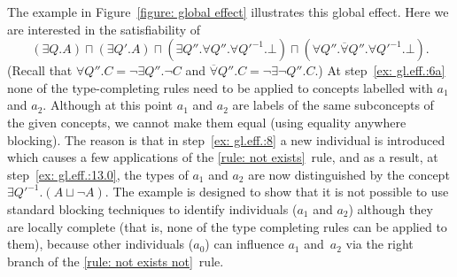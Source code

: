 \documentclass[leqno
,pdflatex
,prodmode
,acmtocl
]{acmsmall}
\def\And{\sqcap}
\def\Not{\neg}
\def\Or{\sqcup}
\newcommand{\indiv}{a}
\newcommand{\cname}{A}
\newcommand{\rname}{Q}
\newcommand{\cbot}{\mathord{\bot}}
\begin{document}
The example in Figure~\ref{figure: global effect} illustrates this
global effect.
Here we are interested in the satisfiability of 
\[
   (\exists \rname.\cname)\And
   (\exists Q'.\cname)\And
   (\exists Q''.\forall Q''.\forall Q'^{-1}.\cbot)\And
   (\forall Q''.\overline\forall Q''.\forall Q'^{-1}.\cbot).
\]
(Recall that $\forall Q''.C=\Not\exists Q''.\Not C$ and $\overline\forall Q''.C=\Not\exists\Not Q''.C$.)
At step~\ref{ex: gl.eff.:6a}
none of the type-completing rules need to be applied to
concepts labelled with $\indiv_1$ and $\indiv_2$.
Although at this point $\indiv_1$ and $\indiv_2$ are labels of the same subconcepts of the
given concepts,
we cannot make them equal (using equality anywhere blocking).
The reason is that
in step~\ref{ex: gl.eff.:8}
a new individual is introduced 
which causes a few applications of the \eqref{rule: not exists}~rule,
and
as a result, at step~\ref{ex: gl.eff.:13.0}, the types of
$\indiv_1$ and $\indiv_2$ are now distinguished by the concept $\exists Q'^{-1}.(\cname\Or\Not \cname)$.
The example is designed to show that it is not possible
to use standard blocking techniques
to identify individuals ($\indiv_1$ and $\indiv_2$)
although they are locally complete (that is, none of the type completing rules can be applied to them),
because other individuals ($\indiv_0$) can influence $\indiv_1$ and~$\indiv_2$
via the right branch of the \eqref{rule: not exists not}~rule.
\end{document}
